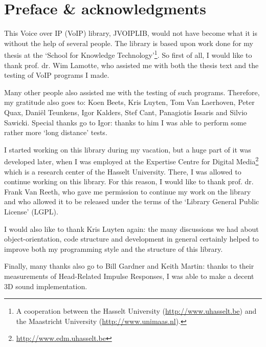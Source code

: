 \chapter*{Preface \& acknowledgments}

This Voice over IP (VoIP) library, JVOIPLIB, would not have become what it is
without the help of several people. The library is based upon work done for my
thesis at the `School for Knowledge Technology'\footnote{A cooperation between
the Hasselt University (\url{http://www.uhasselt.be}) and the
Maastricht University (\url{http://www.unimaas.nl}).}. So first of all,
I would like to thank prof. dr. Wim Lamotte, who assisted me with both the
thesis text and the testing of VoIP programs I made.

Many other people also assisted me with the testing of such programs. Therefore,
my gratitude also goes to: Koen Beets, Kris Luyten, Tom Van Laerhoven, Peter
Quax, Dani\"el Teunkens, Igor Kalders, Stef Cant, Panagiotis Issaris and Silvio
Sawicki. Special thanks go to Igor: thanks to him I was able to perform some
rather more `long distance' tests.

I started working on this library during my vacation, but a huge part of it
was developed later, when I was employed at the Expertise Centre for Digital Media\footnote{
\url{http://www.edm.uhasselt.be}} which is a research center of the Hasselt University. 
There, I was allowed to continue working on this library. For
this reason, I would like to thank prof. dr. Frank Van Reeth, who gave
me permission to continue my work on the library and who allowed it to
be released under the terms of the `Library General Public License' (LGPL).

I would also like to thank Kris Luyten again: the many discussions
we had about object-orientation, code structure and development in general
certainly helped to improve both my programming style and the structure of
this library.

Finally, many thanks also go to Bill Gardner and Keith Martin: thanks to 
their measurements of Head-Related Impulse Responses, I was able to make a 
decent 3D sound implementation.

